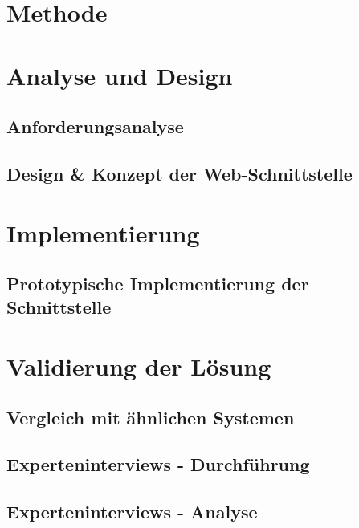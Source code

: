 \documentclass[draft,final]{vutinfth} %
\begin{document}
\chapter{Methode}



\chapter{Analyse und Design}

\section{Anforderungsanalyse}

\section{Design \& Konzept der Web-Schnittstelle}



\chapter{Implementierung}

\section{Prototypische Implementierung der Schnittstelle}



\chapter{Validierung der Lösung}

\section{Vergleich mit ähnlichen Systemen}

\section{Experteninterviews - Durchführung}

\section{Experteninterviews - Analyse}
\end{document}
